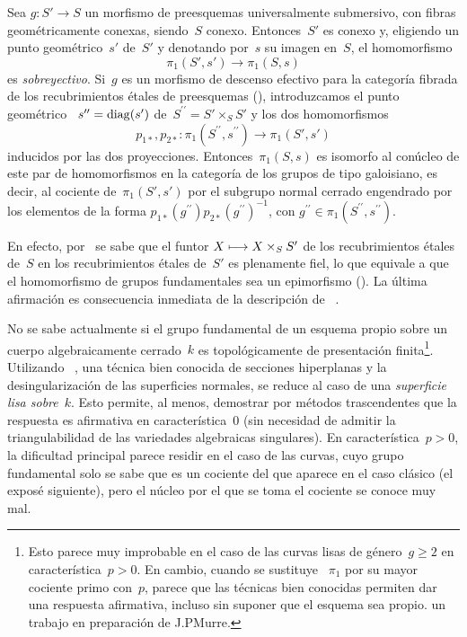 \begin{corollaire}
\label{IX.5.6}
Sea $g\colon S'\to S$ un morfismo de preesquemas universalmente submersivo,
con fibras geométricamente conexas, siendo~$S$ conexo. Entonces~$S'$ es
conexo y, eligiendo un punto geométrico~$s'$ de~$S'$ y denotando por~$s$ su
imagen en~$S$, el homomorfismo
$$
\pi_1(S',s')\to \pi_1(S,s)
$$
es \emph{sobreyectivo}. Si~$g$ es un morfismo de descenso efectivo para la
categoría fibrada de los recubrimientos étales de preesquemas
(\cf \emph{}), introduzcamos el punto geométrico
~$s^{\prime\prime}=\operatorname{diag}(s')$ de~$S^{\prime\prime}=S'\times_S S'$ y los dos
homomorfismos
$$
p_{1*},p_{2*}\colon \pi_1(S^{\prime\prime},s^{\prime\prime}) \to
\pi_1(S',s')
$$
inducidos por las dos proyecciones. Entonces~$\pi_1(S,s)$ es isomorfo al
conúcleo de este par de homomorfismos en la categoría de los grupos de tipo
galoisiano, es decir, al cociente de~$\pi_1(S',s')$ por el subgrupo normal
cerrado engendrado por los
elementos de la forma
$p_{1*}(g^{\prime\prime})p_{2*}(g^{\prime\prime})^{-1}$, con
$g^{\prime\prime}\in \pi_1(S^{\prime\prime},s^{\prime\prime})$.
\end{corollaire}

En efecto, por~ se sabe que el funtor
$X\longmapsto X\times_SS'$ de los recubrimientos étales de~$S$ en los
recubrimientos étales de~$S'$ es plenamente fiel, lo que equivale a que el
homomorfismo de grupos fundamentales sea un epimorfismo (). La
última afirmación es consecuencia inmediata de la descripción de
~.

\begin{remarque}
\label{IX.5.7}
No se sabe actualmente si el grupo fundamental de un esquema propio sobre un
cuerpo algebraicamente cerrado~$k$ es topológicamente de presentación
finita\footnote{Esto parece muy improbable en el caso de las curvas lisas de
género~$g\geq 2$ en característica~$p>0$. En cambio, cuando se sustituye
~$\pi_1$ por su mayor cociente primo con~$p$, parece que las técnicas bien
conocidas permiten dar una respuesta afirmativa, incluso sin suponer que el
esquema sea propio. \Cf un trabajo en preparación de J.P\ptbl Murre.}. Utilizando
~, una técnica bien conocida de secciones hiperplanas y la
desingularización de las superficies normales, se reduce al caso de una
\emph{superficie lisa sobre}~$k$. Esto permite, al menos, demostrar por
métodos trascendentes que la respuesta es afirmativa en característica~$0$
(sin necesidad de admitir la triangulabilidad de las variedades algebraicas
singulares). En característica~$p>0$, la dificultad principal parece residir
en el caso de las curvas, cuyo grupo fundamental solo se sabe que es un
cociente del que aparece en el caso clásico (\cf el exposé siguiente), pero
el núcleo por el que se toma el cociente se conoce muy mal.
\end{remarque}

